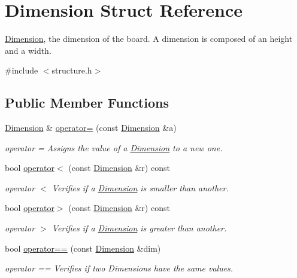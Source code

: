\hypertarget{struct_dimension}{}\section{Dimension Struct Reference}
\label{struct_dimension}


\hyperlink{struct_dimension}{Dimension}, the dimension of the board. A dimension is composed of an height and a width.  




{\ttfamily \#include $<$structure.\+h$>$}

\subsection*{Public Member Functions}
\begin{DoxyCompactItemize}
\item 
\hyperlink{struct_dimension}{Dimension} \& \hyperlink{struct_dimension_acbce569721e053b72d6ed134ed649fe4}{operator=} (const \hyperlink{struct_dimension}{Dimension} \&a)
\begin{DoxyCompactList}\small\item\em operator = Assigns the value of a \hyperlink{struct_dimension}{Dimension} to a new one. \end{DoxyCompactList}\item 
bool \hyperlink{struct_dimension_a193e00a30205877faa6eb2978e11894f}{operator$<$} (const \hyperlink{struct_dimension}{Dimension} \&r) const
\begin{DoxyCompactList}\small\item\em operator $<$ Verifies if a \hyperlink{struct_dimension}{Dimension} is smaller than another. \end{DoxyCompactList}\item 
bool \hyperlink{struct_dimension_a31342c295eeff5e9fc89e47656192c5d}{operator$>$} (const \hyperlink{struct_dimension}{Dimension} \&r) const
\begin{DoxyCompactList}\small\item\em operator $>$ Verifies if a \hyperlink{struct_dimension}{Dimension} is greater than another. \end{DoxyCompactList}\item 
bool \hyperlink{struct_dimension_aa50ef143b3130d4810950788a580b342}{operator==} (const \hyperlink{struct_dimension}{Dimension} \&dim)
\begin{DoxyCompactList}\small\item\em operator == Verifies if two Dimensions have the same values. \end{DoxyCompactList}\end{DoxyCompactItemize}
